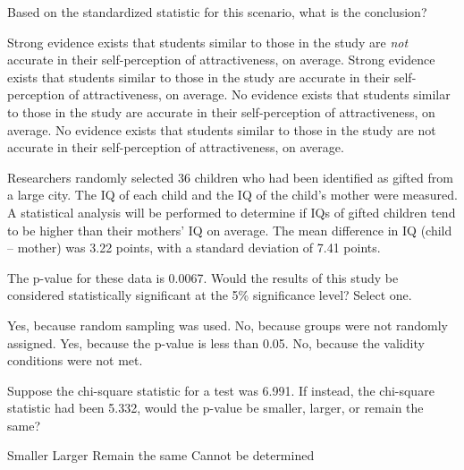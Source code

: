 \documentclass{article}
\begin{document}
\begin{mcquestions}
		\question[follow] Based on the standardized statistic for this scenario, what is the conclusion? \label{self-societal-3}
		\begin{mcanswerslist}
			\answer[correct] Strong evidence exists that students similar to those in the study are \textit{not} accurate in their self-perception of attractiveness, on average.
			\answer Strong evidence exists that students similar to those in the study are accurate in their self-perception of attractiveness, on average.
			\answer No evidence exists that students similar to those in the study are accurate in their self-perception of attractiveness, on average.
			\answer No evidence exists that students similar to those in the study are not accurate in their self-perception of attractiveness, on average.
		\end{mcanswerslist}
		
		\question Researchers randomly selected 36 children who had been identified as gifted from a large city. The IQ of each child and the IQ of the child's mother were measured. A statistical analysis will be performed to determine if IQs of gifted children tend to be higher than their mothers' IQ on average. The mean difference in IQ (child – mother) was 3.22 points, with a standard deviation of 7.41 points.
		
		The p-value for these data is 0.0067. Would the results of this study be considered statistically significant at the 5\% significance level?  Select one. 
		\begin{mcanswerslist}
			\answer Yes, because random sampling was used.
			\answer No, because groups were not randomly assigned.
			\answer[correct] Yes, because the p-value is less than 0.05.
			\answer No, because the validity conditions were not met.
		\end{mcanswerslist}
		
		
		\question Suppose the chi-square statistic for a test was 6.991. If instead, the chi-square statistic had been 5.332, would the p-value be smaller, larger, or remain the same?
		\begin{mcanswerslist}
			\answer Smaller
			\answer[correct] Larger
			\answer Remain the same
			\answer Cannot be determined
		\end{mcanswerslist}
		

\end{mcquestions}
\end{document}
